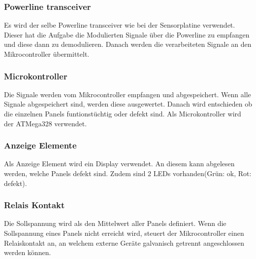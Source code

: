 \subsubsection{Powerline transceiver}
Es wird der selbe Powerline transceiver wie bei der Sensorplatine verwendet. Dieser hat die Aufgabe die Modulierten Signale über die Powerline zu empfangen und diese dann zu demodulieren. Danach werden die verarbeiteten Signale an den Mikrocontroller übermittelt.

\subsubsection{Microkontroller}
Die Signale werden vom Mikrocontroller empfangen und abgespeichert. Wenn alle Signale abgespeichert sind, werden diese ausgewertet. Danach wird entschieden ob die einzelnen Panels funtionstüchtig oder defekt sind. Als Microkontroller wird der ATMega328 verwendet.

\subsubsection{Anzeige Elemente}
Als Anzeige Element wird ein Display verwendet. An diesem kann abgelesen werden, welche Panels defekt sind. Zudem sind 2 LEDs vorhanden(Grün: ok, Rot: defekt).

\subsubsection{Relais Kontakt}
Die Sollspannung wird als den Mittelwert aller Panels definiert.
Wenn die Sollspannung eines Panels nicht erreicht wird, steuert der Mikrocontroller einen Relaiskontakt an, an welchem externe Geräte galvanisch getrennt angeschlossen werden können.

%

